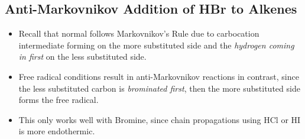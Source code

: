 \begin{itemize}
  \subsection{Anti-Markovnikov Addition of HBr to Alkenes}\label{Anti-Markovnikov Addition of HBr to Alkenes}
  \begin{itemize}
      \item Recall that normal \hyperref[Hydrohalogenation]{} follows Markovnikov's Rule due to carbocation intermediate forming on the more substituted side and the \emph{hydrogen coming in first} on the less substituted side.
      \item Free radical conditions result in anti-Markovnikov reactions in contrast, since the less substituted carbon is \emph{brominated first}, then the more substituted side forms the free radical.
      \item This only works well with Bromine, since chain propagations using HCl or HI is more endothermic.
  \end{itemize}
\end{itemize}